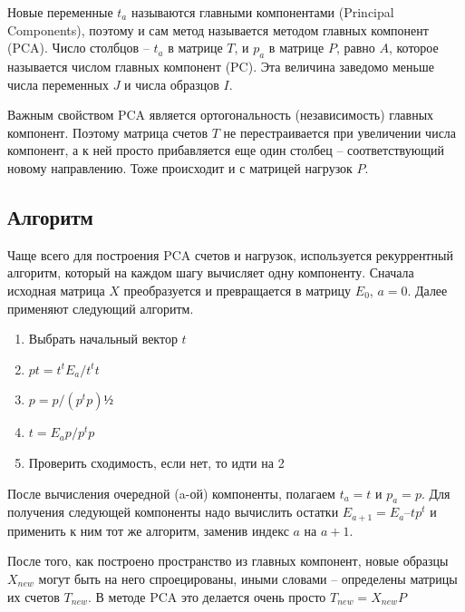 \documentclass[../body.tex]{subfiles}
\begin{document}
	 Новые переменные $t_a$ называются главными компонентами (Principal Components), поэтому и сам метод называется методом главных компонент (PCA). Число столбцов – $t_a$ в матрице $T$, и $p_a$ в матрице $P$, равно $A$, которое называется числом главных компонент (PC). Эта величина заведомо меньше числа переменных $J$ и числа образцов $I$. 
	 
	 Важным свойством PCA является ортогональность (независимость) главных компонент. Поэтому матрица счетов $T$ не перестраивается при увеличении числа компонент, а к ней просто прибавляется еще один столбец – соответствующий новому направлению. Тоже происходит и с матрицей нагрузок $P$.
	 \subsection{Алгоритм}
	 Чаще всего для построения PCA счетов и нагрузок, используется рекуррентный алгоритм, который на каждом шагу вычисляет одну компоненту. Сначала исходная матрица $X$ преобразуется и превращается в матрицу $E_0$, $a=0$. Далее применяют следующий алгоритм. 
	 \begin{enumerate}
	 	\item Выбрать начальный вектор $t$
	 	\item $pt = t^tE_a/t^tt$
	 	\item $p = p/(p^tp)½$
	 	\item $t = E_ap/p^tp$
	 	\item  Проверить сходимость, если нет, то идти на 2
	 \end{enumerate}
	 После вычисления очередной (a-ой) компоненты, полагаем $t_a=t$ и $p_a=p$. Для получения следующей компоненты надо вычислить остатки $E_{a+1} = E_a – t p^t$ и применить к ним тот же алгоритм, заменив индекс $a$ на $a+1$.
	 
	 После того, как построено пространство из главных компонент, новые образцы $X_{new}$ могут быть на него спроецированы, иными словами – определены матрицы их счетов $T_{new}$. В методе PCA это делается очень просто $T_{new}= X_{new}P$
\end{document}
